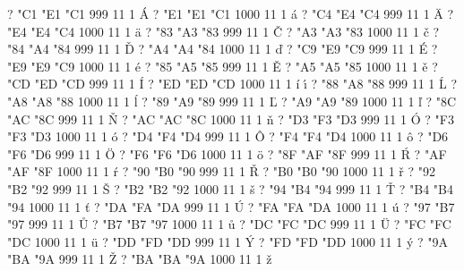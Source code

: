 \setcharcode  ?  "C1  "E1  "C1   999  11  1  \texaccent \'A
\setcharcode  ?  "E1  "E1  "C1  1000  11  1  \texaccent \'a
\setcharcode  ?  "C4  "E4  "C4   999  11  1  \texaccent \"A
\setcharcode  ?  "E4  "E4  "C4  1000  11  1  \texaccent \"a
\setcharcode  ?  "83  "A3  "83   999  11  1  \texaccent \v C
\setcharcode  ?  "A3  "A3  "83  1000  11  1  \texaccent \v c
\setcharcode  ?  "84  "A4  "84   999  11  1  \texaccent \v D
\setcharcode  ?  "A4  "A4  "84  1000  11  1  \texaccent \v d
\setcharcode  ?  "C9  "E9  "C9   999  11  1  \texaccent \'E
\setcharcode  ?  "E9  "E9  "C9  1000  11  1  \texaccent \'e
\setcharcode  ?  "85  "A5  "85   999  11  1  \texaccent \v E
\setcharcode  ?  "A5  "A5  "85  1000  11  1  \texaccent \v e
\setcharcode  ?  "CD  "ED  "CD   999  11  1  \texaccent \'I
\setcharcode  ?  "ED  "ED  "CD  1000  11  1  \texaccent \'i  \texaccent \'\i
\setcharcode  ?  "88  "A8  "88   999  11  1  \texaccent \'L
\setcharcode  ?  "A8  "A8  "88  1000  11  1  \texaccent \'l
\setcharcode  ?  "89  "A9  "89   999  11  1  \texaccent \v L
\setcharcode  ?  "A9  "A9  "89  1000  11  1  \texaccent \v l
\setcharcode  ?  "8C  "AC  "8C   999  11  1  \texaccent \v N
\setcharcode  ?  "AC  "AC  "8C  1000  11  1  \texaccent \v n
\setcharcode  ?  "D3  "F3  "D3   999  11  1  \texaccent \'O
\setcharcode  ?  "F3  "F3  "D3  1000  11  1  \texaccent \'o
\setcharcode  ?  "D4  "F4  "D4   999  11  1  \texaccent \^O
\setcharcode  ?  "F4  "F4  "D4  1000  11  1  \texaccent \^o
\setcharcode  ?  "D6  "F6  "D6   999  11  1  \texaccent \"O
\setcharcode  ?  "F6  "F6  "D6  1000  11  1  \texaccent \"o
\setcharcode  ?  "8F  "AF  "8F   999  11  1  \texaccent \'R
\setcharcode  ?  "AF  "AF  "8F  1000  11  1  \texaccent \'r
\setcharcode  ?  "90  "B0  "90   999  11  1  \texaccent \v R
\setcharcode  ?  "B0  "B0  "90  1000  11  1  \texaccent \v r
\setcharcode  ?  "92  "B2  "92   999  11  1  \texaccent \v S
\setcharcode  ?  "B2  "B2  "92  1000  11  1  \texaccent \v s
\setcharcode  ?  "94  "B4  "94   999  11  1  \texaccent \v T
\setcharcode  ?  "B4  "B4  "94  1000  11  1  \texaccent \v t
\setcharcode  ?  "DA  "FA  "DA   999  11  1  \texaccent \'U
\setcharcode  ?  "FA  "FA  "DA  1000  11  1  \texaccent \'u
\setcharcode  ?  "97  "B7  "97   999  11  1  \texaccent \r U
\setcharcode  ?  "B7  "B7  "97  1000  11  1  \texaccent \r u
\setcharcode  ?  "DC  "FC  "DC   999  11  1  \texaccent \"U
\setcharcode  ?  "FC  "FC  "DC  1000  11  1  \texaccent \"u
\setcharcode  ?  "DD  "FD  "DD   999  11  1  \texaccent \'Y
\setcharcode  ?  "FD  "FD  "DD  1000  11  1  \texaccent \'y
\setcharcode  ?  "9A  "BA  "9A   999  11  1  \texaccent \v Z
\setcharcode  ?  "BA  "BA  "9A  1000  11  1  \texaccent \v z


